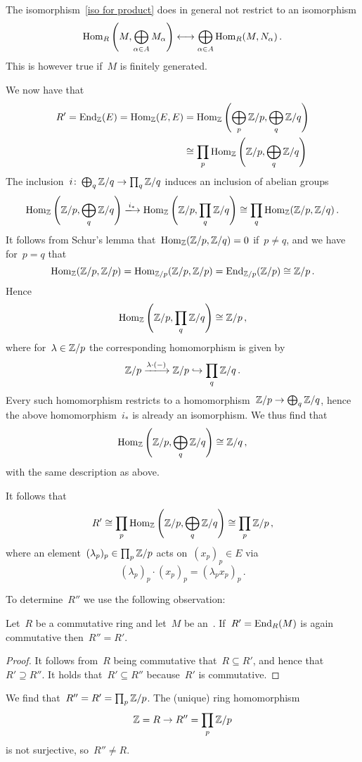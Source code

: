 \begin{warning}
  The isomorphism~\eqref{iso for product} does in general not restrict to an isomorphism
  \[
      \operatorname{Hom}_R\left( M, \bigoplus_{\alpha \in A} M_\alpha \right)
    \longleftrightarrow
      \bigoplus_{\alpha \in A} \operatorname{Hom}_R(M, N_\alpha) \,.
  \]
  This is however true if~$M$ is finitely generated.
\end{warning}

We now have that
\begin{align*}
          R'
   =      \operatorname{End}_{\mathbb{Z}}(E)
   =      \operatorname{Hom}_{\mathbb{Z}}(E, E)
  &=      \operatorname{Hom}_{\mathbb{Z}}\left( \bigoplus_p \mathbb{Z}/p , \bigoplus_q \mathbb{Z}/q \right) \\
  &\cong  \prod_p \operatorname{Hom}_{\mathbb{Z}} \left( \mathbb{Z}/p, \bigoplus_q \mathbb{Z}/q \right)
\end{align*}
The inclusion~$i \colon \bigoplus_q \mathbb{Z}/q \to \prod_q \mathbb{Z}/q$ induces an inclusion of abelian groups
\[
                \Hom_\Integer \left( \Integer/p, \bigoplus_q \Integer/q \right)
  \xlongto{i_*} \Hom_\Integer \left( \Integer/p, \prod_q \Integer/q \right)
  \cong         \prod_q \Hom_\Integer( \Integer/p, \Integer/q ) \,.
\]
It follows from Schur’s lemma that~$\operatorname{Hom}_{\mathbb{Z}}(\mathbb{Z}/p, \mathbb{Z}/q) = 0$ if~$p \neq q$, and we have for~$p = q$ that
\[
        \operatorname{Hom}_{\mathbb{Z}}( \mathbb{Z}/p, \mathbb{Z}/p )
  =     \operatorname{Hom}_{\mathbb{Z}/p}( \mathbb{Z}/p, \mathbb{Z}/p )
  =     \operatorname{End}_{\mathbb{Z}/p}( \mathbb{Z}/p )
  \cong \mathbb{Z}/p \,.
\]
Hence
\[
        \operatorname{Hom}_{\mathbb{Z}} \left( \mathbb{Z}/p, \prod_q \mathbb{Z}/q \right)
  \cong \mathbb{Z}/p \,,
\]
where for~$\lambda \in \mathbb{Z}/p$ the corresponding homomorphism is given by
\[
  \Integer/p
  \xlongto{\lambda \cdot (-)}
  \Integer/p
  \inclusion
  \prod_q \Integer/q \,.
\]
Every such homomorphism restricts to a homomorphism~$\mathbb{Z}/p \to \bigoplus_q \mathbb{Z}/q$, hence the above homomorphism~$i_*$ is already an isomorphism.
We thus find that
\[
        \operatorname{Hom}_{\mathbb{Z}} \left( \mathbb{Z}/p, \bigoplus_q \mathbb{Z}/q \right)
  \cong \mathbb{Z}/q \,,
\]
with the same description as above.

It follows that
\[
        R'
  \cong \prod_p \operatorname{Hom}_{\mathbb{Z}} \left( \mathbb{Z}/p, \bigoplus_q \mathbb{Z}/q \right)
  \cong \prod_p \mathbb{Z}/p \,,
\]
where an element~$(\lambda_p)_p \in \prod_p \mathbb{Z}/p$ acts on~$(x_p)_p \in E$ via
\[
    (\lambda_p)_p \cdot (x_p)_p
  = (\lambda_p x_p)_p \,.
\]

To determine~$R''$ we use the following observation:

\begin{lemma}
  Let~$R$ be a commutative ring and let~$M$ be an~{}.
  If~$R' = \operatorname{End}_R(M)$ is again commutative then~$R'' = R'$.
\end{lemma}

\begin{proof}
  It follows from~$R$ being commutative that~$R \subseteq R'$, and hence that~$R' \supseteq R''$.
  It holds that~$R' \subseteq R''$ because~$R'$ is commutative.
\end{proof}

We find that~$R'' = R' = \prod_p \mathbb{Z}/p$.
The (unique) ring homomorphism
\[
      \mathbb{Z}
  =   R
  \to R''
  =   \prod_p \mathbb{Z}/p
\]
is not surjective, so~$R'' \neq R$.



